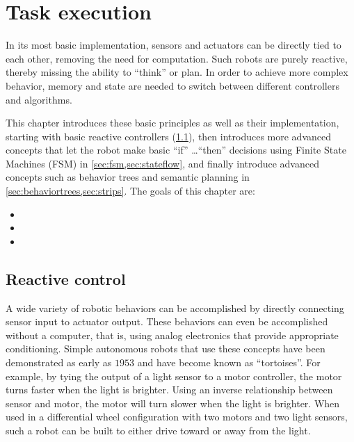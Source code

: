 \chapter{Task execution}\label{chap:taskexecution}

In its most basic implementation, sensors and actuators can be directly tied to each other, removing the need for computation. Such robots are purely reactive, thereby missing the ability to ``think'' or plan. In order to achieve more complex behavior, memory and state are needed to switch between different controllers and algorithms.

This chapter introduces these basic principles as well as their implementation, starting with basic reactive controllers (\cref{sec:braitenberg}), then introduces more advanced concepts that let the robot make basic ``if'' \ldots ``then'' decisions using Finite State Machines (FSM) in \cref{sec:fsm,sec:stateflow}, and finally introduce advanced concepts such as behavior trees and semantic planning in \cref{sec:behaviortrees,sec:strips}.
The goals of this chapter are:

\begin{itemize}
    \item {}
    \item {}
    \item {}
\end{itemize}

\section{Reactive control}\label{sec:braitenberg}

A wide variety of robotic behaviors can be accomplished by directly connecting sensor input to actuator output. These behaviors can even be accomplished without a computer, that is, using analog electronics that provide appropriate conditioning.
Simple autonomous robots that use these concepts have been demonstrated as early as $1953$ \cite{walter1953living} and have become known as ``tortoises''. For example, by tying the output of a light sensor to a motor controller, the motor turns faster when the light is brighter. Using an inverse relationship between sensor and motor, the motor will turn slower when the light is brighter. When used in a differential wheel configuration with two motors and two light sensors, such a robot can be built to either drive toward or away from the light.

